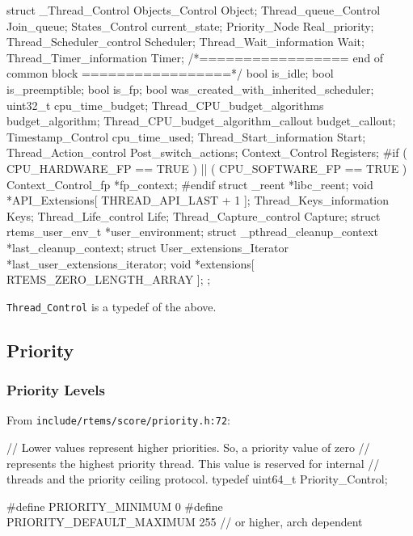 \begin{nicec}
struct _Thread_Control {
  Objects_Control          Object;
  Thread_queue_Control     Join_queue;
  States_Control           current_state;
  Priority_Node            Real_priority;
  Thread_Scheduler_control Scheduler;
  Thread_Wait_information  Wait;
  Thread_Timer_information Timer;
     /*================= end of common block =================*/
  bool                                  is_idle;
  bool                                  is_preemptible;
  bool                                  is_fp;
  bool was_created_with_inherited_scheduler;
  uint32_t                              cpu_time_budget;
  Thread_CPU_budget_algorithms          budget_algorithm;
  Thread_CPU_budget_algorithm_callout   budget_callout;
  Timestamp_Control                     cpu_time_used;
  Thread_Start_information              Start;
  Thread_Action_control                 Post_switch_actions;
  Context_Control                       Registers;
#if ( CPU_HARDWARE_FP == TRUE ) || ( CPU_SOFTWARE_FP == TRUE )
  Context_Control_fp                    *fp_context;
#endif
  struct _reent                         *libc_reent;
  void                                  *API_Extensions[ THREAD_API_LAST + 1 ];
  Thread_Keys_information               Keys;
  Thread_Life_control                   Life;
  Thread_Capture_control                Capture;
  struct rtems_user_env_t               *user_environment;
  struct _pthread_cleanup_context       *last_cleanup_context;
  struct User_extensions_Iterator       *last_user_extensions_iterator;
  void                                  *extensions[ RTEMS_ZERO_LENGTH_ARRAY ];
};
\end{nicec}

\verb"Thread_Control" is a typedef of the above.


\newpage
\subsection{Priority}

\subsubsection{Priority Levels}

From \texttt{include/rtems/score/priority.h:72}:
\begin{nicec}
 // Lower values represent higher priorities.  So, a priority value of zero
 // represents the highest priority thread.  This value is reserved for internal
 // threads and the priority ceiling protocol.
typedef uint64_t Priority_Control;

#define PRIORITY_MINIMUM      0
#define PRIORITY_DEFAULT_MAXIMUM      255 // or higher, arch dependent
\end{nicec}


